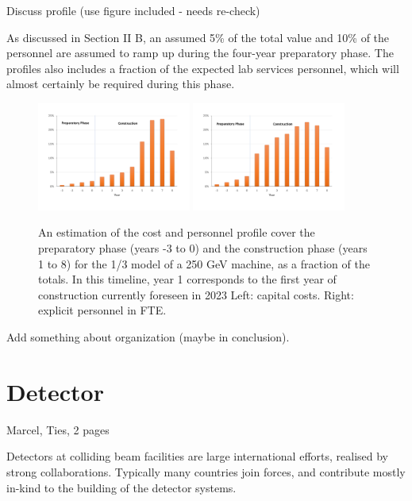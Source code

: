 \documentclass[%
 reprint,
 amsmath,amssymb,
 aps,
]{revtex4-1}
\begin{document}
Discuss profile (use figure included - needs re-check)

As discussed in Section II B, an assumed 5\% of the total value and 10\% of the personnel are assumed
to ramp up during the four-year preparatory phase. The profiles also includes a fraction
of the expected lab services personnel, which will almost certainly be required during this
phase. 

\begin{figure}[htbp]
\includegraphics[width=0.45\textwidth]{figures/profile-250GeV-MEUR-norm.pdf}
\includegraphics[width=0.45\textwidth]{figures/profile-250GeV-FTE-norm.pdf}
\caption{\label{fig:costprofile:costprofile} An estimation of the cost and personnel profile cover the preparatory phase (years -3 to 0) 
and the construction phase (years 1 to 8) for the 1/3 model of a 250 GeV machine, as a fraction of the
totals. In this timeline, 
year 1 corresponds to the first year of construction currently foreseen in 2023 
Left: capital costs. Right: explicit personnel in FTE.
}
\end{figure}

Add something about organization (maybe in conclusion).

\section{\label{sec:det}Detector}
Marcel, Ties, 2 pages

Detectors at colliding beam facilities are large international efforts, realised by strong collaborations. Typically many countries join forces, and contribute mostly in-kind to the building of the detector systems. 
\end{document}

